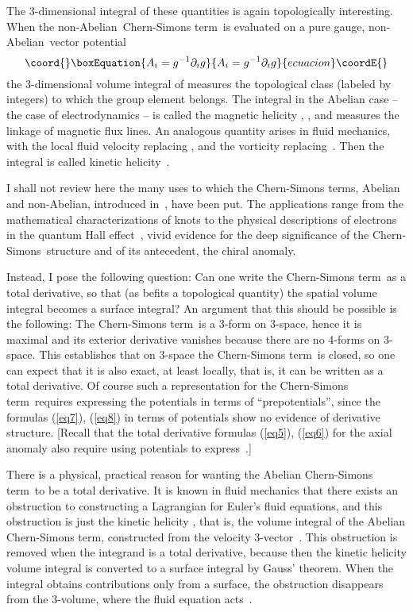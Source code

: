\documentclass[a4paper,12pt,twoside]{article}
\providecommand{\rd}[1]{\mathop{\mathrm{d}#1}}
\providecommand{\grad}{\vec\nabla}
\providecommand{\nA}{non-Abelian}
\providecommand{\CS}{Chern-Simons}
\providecommand{\CSt}{Chern-Simons term}
\providecommand{\pp}[1]{\partial_{#1}}
\providecommand{\numeq}[2]{\begin{equation}\coord{}\boxEquation{
#2
\label{#1}
}{
#2
}{ecuacion}\coordE{}\end{equation}}
\providecommand{\refeq}[1]{(\ref{#1})}
\let\vec\boldsymbol
\begin{document}
The 3-dimensional integral of these quantities is again topologically interesting. When
the
\nA\
\CSt\ is evaluated on a pure gauge, \nA\ vector potential
\numeq{eq9}{
A_i = g^{-1} \pp i g
} 
the 3-dimensional volume integral of \coordHE{} measures the
topological class (labeled by integers) to which the group element \myHighlight{$g$}\coordHE{} belongs. The
integral in the Abelian case -- the case of electrodynamics -- is called the magnetic
helicity
\myHighlight{$\int
\rd{^3 r} \vec A\cdot
\vec B$}\coordHE{},
\myHighlight{$\vec B = \grad
\times \vec A$}\coordHE{}, and measures the linkage of magnetic flux lines. An analogous
quantity arises in fluid mechanics, with the local fluid velocity \myHighlight{$\vec v$}\coordHE{} replacing
\myHighlight{$\vec A$}\coordHE{}, and the vorticity \myHighlight{$\vec\omega = \grad\times\vec v$}\coordHE{} replacing~\myHighlight{$\vec B$}\coordHE{}. Then
the integral \myHighlight{$\int \rd{^3 r} \vec v\cdot \vec\omega$}\coordHE{} is called kinetic
helicity~\cite{ref8}.


I shall not review here the many uses to which the \CSt s, Abelian and \nA,
introduced in~\cite{ref7}, have been put. The applications range from the
mathematical characterizations of knots to the physical descriptions of electrons in
the quantum Hall effect~\cite{ref9}, vivid evidence for the deep significance of the
\CS\ structure and of its antecedent, the chiral anomaly. 

Instead, I pose the following question: Can one write the \CSt\ as a total derivative,
so that (as befits a topological quantity) the spatial volume integral becomes a surface
integral? 
 An argument that this should be possible is the
following: The
\CSt\ is a 3-form on 3-space, hence it is maximal and its exterior derivative vanishes
because there are no 4-forms on 3-space. This establishes that on 3-space  the \CSt\
is closed, so one can expect that it is also exact, at least locally, that is, it can be
written as a total derivative. 
Of course such a representation for the \CSt\ requires expressing the potentials  in
terms of ``prepotentials'', since the formulas \refeq{eq7}, \refeq{eq8} in terms of
potentials show no evidence of derivative structure. 
[Recall that the total derivative formulas \refeq{eq5}, \refeq{eq6} for the axial
anomaly also require using potentials to express~\coordHE{}.]

There is a physical, practical reason for wanting the Abelian \CSt\  to be a total
derivative. It is known in fluid mechanics that there exists an obstruction to
constructing a Lagrangian for Euler's fluid equations, and this obstruction is just the
kinetic helicity  \hbox{\myHighlight{$\int \rd{^3 r} \vec v\cdot \vec\omega$}\coordHE{}}, that is, the volume
integral of the Abelian \CSt, constructed from the velocity 3-vector~\myHighlight{$\vec v$}\coordHE{}. This
obstruction is removed when the integrand is a total derivative, because then the
kinetic helicity volume integral is converted to a surface integral by Gauss' theorem.
When the integral obtains contributions only from a surface,  the obstruction
disappears from the 3-volume, where the fluid equation acts~\cite{ref10}. 
\end{document}
